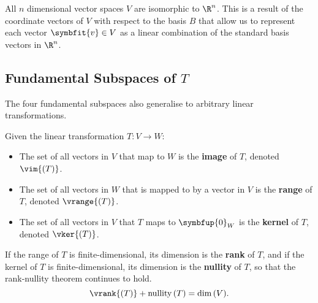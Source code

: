 \documentclass{article}
\DeclareMathOperator*{\nullity}{nullity}
\begin{document}
\begin{multicols*}{3}
\begin{definition}[Isomorphism]
        All \(n\) dimensional vector spaces \(V\) are isomorphic to \(\R^n\). This is a result of the coordinate vectors of \(V\) with respect
        to the basis \(B\) that allow us to represent each vector \(\symbfit{v} \in V\) as a linear combination of the standard basis vectors in \(\R^n\).
    \end{definition}
    \subsection{Fundamental Subspaces of \texorpdfstring{\(T\)}{T}}
    The four fundamental subspaces also generalise to arbitrary linear transformations.

    Given the linear transformation \(T:V \to W\):
    \begin{itemize}
        \item The set of all vectors in \(V\) that map to \(W\) is the \textbf{image} of \(T\), denoted \(\vim{\left( T \right)}\).
        \item The set of all vectors in \(W\) that is mapped to by a vector in \(V\) is the \textbf{range} of \(T\), denoted \(\vrange{\left( T \right)}\).
        \item The set of all vectors in \(V\) that \(T\) maps to \(\symbfup{0}_W\) is the \textbf{kernel} of \(T\), denoted \(\vker{\left( T \right)}\).
    \end{itemize}
    If the range of \(T\) is finite-dimensional, its dimension is the \textbf{rank} of \(T\), and
    if the kernel of \(T\) is finite-dimensional, its dimension is the \textbf{nullity} of \(T\), so
    that the rank-nullity theorem continues to hold.
    \begin{equation*}
        \vrank{\left( T \right)} + \nullity{\left( T \right)} = \dim{\left( V \right)}.
    \end{equation*}

\end{multicols*}
\end{document}

